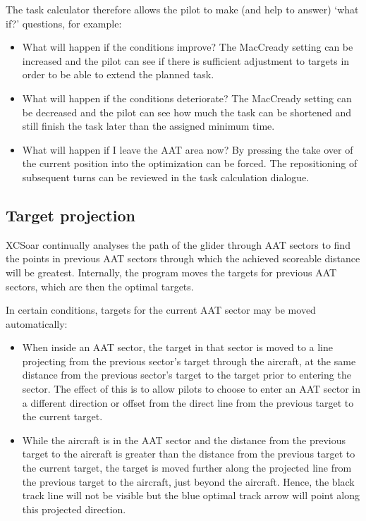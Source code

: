 The task calculator therefore allows the pilot to make (and help to
answer) `what if?' questions, for example:
\begin{itemize}
\item What will happen if the conditions improve?  The MacCready setting can be
increased and the pilot can see if there is sufficient adjustment to targets in
order to be able to extend the planned task.
\item What will happen if the conditions deteriorate?  The MacCready setting can
be decreased and the pilot can see how much the task can be shortened and still
finish the task later than the assigned minimum time.
\item What will happen if I leave the AAT area now?  By pressing  the take over of the current position into the optimization can
be forced. The repositioning of subsequent turns can be reviewed in the task calculation
dialogue.
\end{itemize}

\subsection*{Target projection}

XCSoar continually analyses the path of the glider through AAT sectors
to find the points in previous AAT sectors through which the achieved
scoreable distance will be greatest.  Internally, the program moves
the targets for previous AAT sectors, which are then the optimal
targets.

In certain conditions, targets for the current AAT sector may be moved
automatically:
\begin{itemize}
\item When inside an AAT sector, the target in that sector is moved
to a line projecting from the previous sector's target through the
aircraft, at the same distance from the previous sector's target to
the target prior to entering the sector.  The effect of this is to
allow pilots to choose to enter an AAT sector in a different direction
or offset from the direct line from the previous target to the current
target.

\item While the aircraft is in the AAT sector and the distance from the
previous target to the aircraft is greater than the distance from the
previous target to the current target, the target is moved further
along the projected line from the previous target to the aircraft,
just beyond the aircraft.  Hence, the black track line will not be
visible but the blue optimal track arrow will point along this
projected direction.
\end{itemize}

